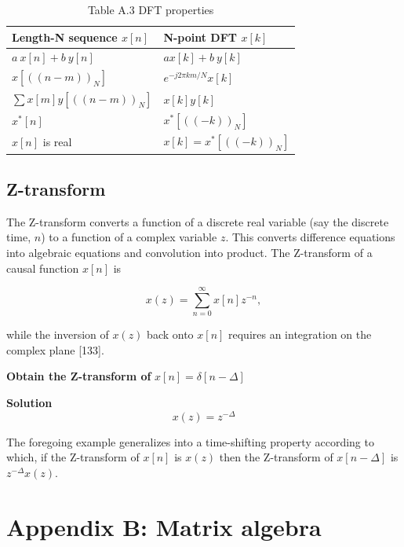 \documentclass[a4paper, 12pt]{book}
\begin{document}
\begin{table}[h]
\centering
\caption{Table A.3 DFT properties}
\begin{tabular}{@{}ll@{}}
\toprule
\textbf{Length-N sequence} $x[n]$ & \textbf{N-point DFT} $x[k]$ \\ \midrule
$a~x[n]+b~y[n]$ & $ax[k]+b~y[k]$ \\
$x[((n-m))_{N}]$ & $e^{-j2\pi km/N}x[k]$ \\
$\sum x[m]y[((n-m))_{N}]$ & $x[k]y[k]$ \\
$x^{*}[n]$ & $x^{*}[((-k))_{N}]$ \\
$x[n]$ is real & $x[k]=x^{*}[((-k))_{N}]$ \\ \bottomrule
\end{tabular}
\end{table}

\section{Z-transform}

The Z-transform converts a function of a discrete real variable (say the discrete time, $n$) to a function of a complex variable $z$. This converts difference equations into algebraic equations and convolution into product. The Z-transform of a causal function $x[n]$ is

\begin{equation}
    x(z)=\sum_{n=0}^{\infty}x[n]z^{-n}, \tag{A.13}
\end{equation}

while the inversion of $x(z)$ back onto $x[n]$ requires an integration on the complex plane [133].

\begin{greenbox}[Example A.1]
\textbf{Obtain the Z-transform of} $x[n]=\delta[n-\Delta]$

\textbf{Solution}
$$ x(z)=z^{-\Delta} $$
\end{greenbox}

The foregoing example generalizes into a time-shifting property according to which, if the Z-transform of $x[n]$ is $x(z)$ then the Z-transform of $x[n-\Delta]$ is $z^{-\Delta}x(z).$

\newpage
\setcounter{chapter}{2}
\setcounter{section}{0}
\chapter*{Appendix B: Matrix algebra}
\end{document}
